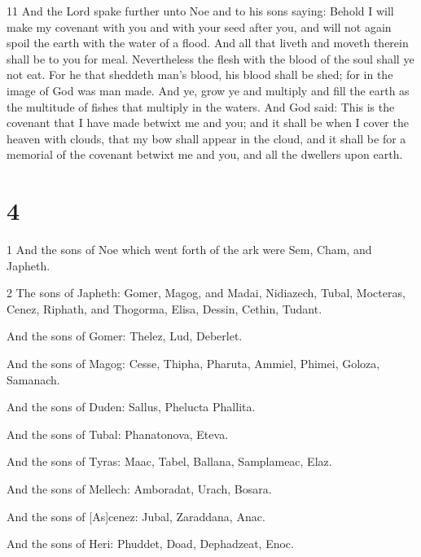 \par 11 And the Lord spake further unto Noe and to his sons saying: Behold I will make my covenant with you and with your seed after you, and will not again spoil the earth with the water of a flood. And all that liveth and moveth therein shall be to you for meal. Nevertheless the flesh with the blood of the soul shall ye not eat. For he that sheddeth man's blood, his blood shall be shed; for in the image of God was man made. And ye, grow ye and multiply and fill the earth as the multitude of fishes that multiply in the waters. And God said: This is the covenant that I have made betwixt me and you; and it shall be when I cover the heaven with clouds, that my bow shall appear in the cloud, and it shall be for a memorial of the covenant betwixt me and you, and all the dwellers upon earth.

\chapter{4}

\par 1 And the sons of Noe which went forth of the ark were Sem, Cham, and Japheth.

\par 2 The sons of Japheth: Gomer, Magog, and Madai, Nidiazech, Tubal, Mocteras, Cenez, Riphath, and Thogorma, Elisa, Dessin, Cethin, Tudant.

\par And the sons of Gomer: Thelez, Lud, Deberlet.

\par And the sons of Magog: Cesse, Thipha, Pharuta, Ammiel, Phimei, Goloza, Samanach.

\par And the sons of Duden: Sallus, Phelucta Phallita.

\par And the sons of Tubal: Phanatonova, Eteva.

\par And the sons of Tyras: Maac, Tabel, Ballana, Samplameac, Elaz.

\par And the sons of Mellech: Amboradat, Urach, Bosara.

\par And the sons of [As]cenez: Jubal, Zaraddana, Anac.

\par And the sons of Heri: Phuddet, Doad, Dephadzeat, Enoc.

